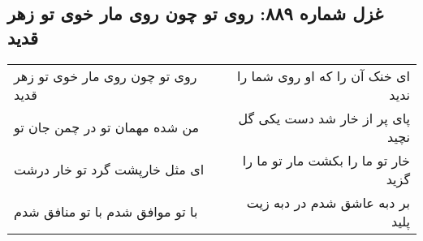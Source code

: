 \begin{center}
\section*{غزل شماره ۸۸۹: روی تو چون روی مار خوی تو زهر قدید}
\label{sec:0889}
\begin{longtable}{l p{0.5cm} r}
روی تو چون روی مار خوی تو زهر قدید
&&
ای خنک آن را که او روی شما را ندید
\\
من شده مهمان تو در چمن جان تو
&&
پای پر از خار شد دست یکی گل نچید
\\
ای مثل خارپشت گرد تو خار درشت
&&
خار تو ما را بکشت مار تو ما را گزید
\\
با تو موافق شدم با تو منافق شدم
&&
بر دبه عاشق شدم در دبه زیت پلید
\\
\end{longtable}
\end{center}
